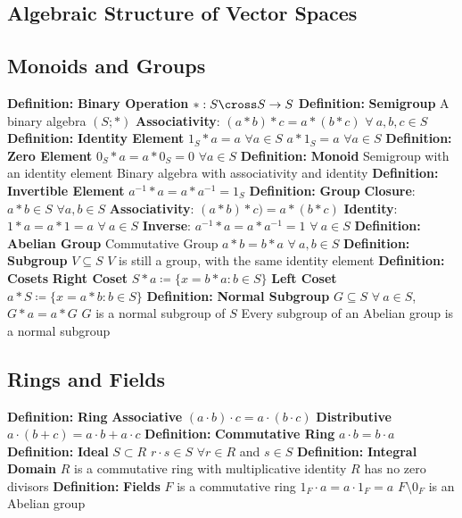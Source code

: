 \documentclass[14pt]{extarticle}
\def\Definition{{\color{blue} \textbf{Definition:} }}
\begin{document}
\begin{outline}
	\section*{Algebraic Structure of Vector Spaces}
		\subsection*{Monoids and Groups}
			\1 \Definition \textbf{Binary Operation}
				\2	$* : S \cross S \rightarrow S$
			\1	\Definition	\textbf{Semigroup}
				\2	A binary algebra $(S;*)$
				\2	\textbf{Associativity}: $(a * b) * c = a * (b * c)$ $\forall~a,b,c \in S$
			\1	\Definition \textbf{Identity Element}
				\2	$1_S * a = a$ $\forall a \in S$
				\2	$a * 1_S = a$ $\forall a \in S$
			\1	\Definition \textbf{Zero Element}
				\2	$0_S * a = a * 0_S = 0$ $\forall a \in S$
			\1	\Definition \textbf{Monoid}
				\2	Semigroup with an identity element
				\2	Binary algebra with associativity and identity
			\1	\Definition \textbf{Invertible Element}
				\2	$a^{-1} * a = a * a^{-1} = 1_S$
			\1	\Definition \textbf{Group}
				\2	\textbf{Closure}: $a * b \in S$ $\forall a,b \in S$
				\2	\textbf{Associativity}: $(a*b)*c) = a*(b*c)$
				\2	\textbf{Identity}: $1 * a = a * 1 = a$ $\forall~a \in S$
				\2	\textbf{Inverse}: $a^{-1} * a = a * a^{-1} = 1$ $\forall~a \in S$
			\1	\Definition \textbf{Abelian Group}
				\2	Commutative Group
				\2	$a * b = b * a$ $\forall~a,b \in S$
			\1	\Definition \textbf{Subgroup}
				\2	$V \subseteq S$
				\2	$V$ is still a group, with the same identity element
			\1	\Definition \textbf{Cosets}
				\2	\textbf{Right Coset}
					\3	$S * a \coloneqq \{x = b * a : b \in S\}$
				\2	\textbf{Left Coset}
					\3	$a * S \coloneqq \{x = a * b : b \in S\}$
			\1	\Definition \textbf{Normal Subgroup}
				\2	$G \subseteq S$
				\2	$\forall~a \in S$, $G * a = a * G$
				\2	$G$ is a normal subgroup of $S$
				\2	Every subgroup of an Abelian group is a normal subgroup

		\subsection*{Rings and Fields}
			\1	\Definition \textbf{Ring}
				\2	\textbf{Associative} $(a \cdot b) \cdot c = a \cdot (b \cdot c)$
				\2	\textbf{Distributive} $a \cdot (b + c) = a \cdot b + a \cdot c$
			\1	\Definition \textbf{Commutative Ring}
				\2	$a \cdot b = b \cdot a$
			\1	\Definition \textbf{Ideal}
				\2	$S \subset R$
				\2	$r \cdot s \in S$ $\forall r \in R$ and $s \in S$
			\1	\Definition \textbf{Integral Domain}
				\2	$R$ is a commutative ring with multiplicative identity
				\2	$R$ has no zero divisors
			\1	\Definition \textbf{Fields}
				\2	$F$ is a commutative ring
				\2	$1_F \cdot a = a \cdot 1_F = a$
				\2	$F \setminus 0_F$ is an Abelian group


\end{outline}
\end{document}
